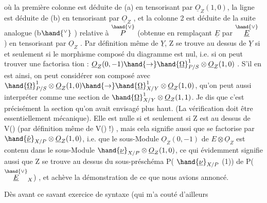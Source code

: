 où la première colonne est déduite de (a) en tensorisant par $\underline{O}_Z(1,0)$,
la ligne est déduite de  (b) en tensorisant par $\underline{O}_Z$  , et la colonne 2
est déduite  de la  suite analogue  (b$\hand{^\vee}$ ) relative à $\overset{\hand{\vee}}{P}$  (obtenue
en remplaçant $\underline{E}$ par $\overset{\hand{\vee}}{\underline{E}}$ )  en tensorisant par $\underline{O}_Z$ . Par définition même
de $\underline{Y}$, Z se trouve au dessus de $\underline{Y}$  si et seulement si le morphisme
composé \hand{$\alpha$} du diagramme est nul, i.e.  si on peut trouver une  factorisa
tion \hand{$\beta$}: $\underline{O}_Z(0,-1) \hand{\rightarrow} \hand{\underline{\Omega}}^1_{P/S}\otimes \underline{O}_Z(1,0)$ .  S'il en est ainsi, on  peut
considérer  son composé avec  $\hand{\underline{\Omega}}^1_{P/S} \otimes \underline{O}_Z(1,0) \hand{\rightarrow} \hand{\underline{\Omega}}^1_{X/Y} \otimes \underline{O}_Z(1,0)$,
qu'on peut aussi interpréter comme une section de $\hand{\underline{\Omega}}^1_{X/Y}\otimes \underline{O}_Z(1,1)$.
Je dis que c'est précisément la section  qu'on avait envisagé plus haut.
(La vérification doit être essentiellement mécanique).  Elle est
nulle  si et seulement si  Z est au dessus de V(\hand{$\mu$})  (par définition
même de V(\hand{$\mu$}) !) , mais cela signifie aussi  que \hand{$\beta$} se factorise par
$\hand{\check{\underline{\nu}}}_{X/P} \otimes \underline{O}_Z(1,0)$, i.e. que  le sous-Module $\underline{O}_Z(0,-1)$ de $E\otimes \underline{O}_Z$ est contenu
dans le sous-Module $\hand{\underline{\nu}}_{X/P} \otimes \underline{O}_Z(1,0)$,  ce qui évidemment signifie aussi
que  Z se trouve au dessus du sous-préschéma  P( $\hand{\underline{\nu}}_{X/P}$ (1)) de P($\overset{\hand{\vee}}{\underline{E}}_X$) , et
achève la démonstration de ce que nous avions annoncé.

Dès avant ce savant exercice de syntaxe (qui m'a couté d'ailleurs

